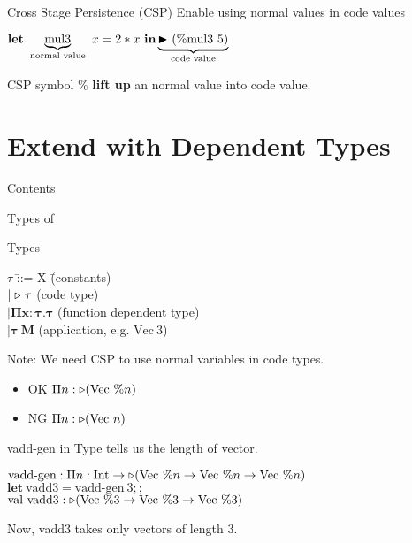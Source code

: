 \documentclass[dvipdfmx,aspectratio=169, 20pt]{beamer}
\begin{document}
\begin{frame}[fragile]{Cross Stage Persistence (CSP)}
    Enable using normal values in code values
    \begin{center}
        \( \textbf{let}\ \underbrace{\text{mul3}}_{\text{normal value}}\ x = 2 * x\ \textbf{in} \underbrace{{\mathop{\blacktriangleright}}\ (\% \text{mul3}\ 5)}_{\text{code value}} \)
    \end{center}
    CSP symbol \( \% \) {\bf{lift up}} an normal value into code value.
\end{frame}

\section{Extend \LTP with Dependent Types}

\begin{frame}{Contents}
    \tableofcontents[currentsection]
  \note{
  }
\end{frame}

\begin{frame}[fragile]{Types of \LMD}
    \begin{block}{Types}
    \begin{tabbing}
        \hspace{5mm} \( \tau \) \= ::= X \hspace{20mm} \= (constants) \\
        \> \( \mid {\mathop{\triangleright}}\ \tau \) \> (code type) \\
        \> \( \bm{\mid \Pi x:\tau.\tau} \) \> (function dependent type) \\
        \> \( \bm{\mid \tau\ M} \) \> (application, e.g. \(\text{Vec}\ 3\))
    \end{tabbing}
    \end{block}
    Note: We need CSP to use normal variables in code types.
    \begin{itemize}
        \item OK  \( \Pi n: {\mathop{\triangleright}} (\text{Vec}\ \%n) \)
        \item NG  \( \Pi n: {\mathop{\triangleright}} (\text{Vec}\ n) \)
    \end{itemize}
   \note{
    }
\end{frame}

\begin{frame}[fragile]{vadd-gen in \LMD}
    Type tells us the length of vector.
    \newcommand{\Vn}{\text{Vec}\ \%n}
    \newcommand{\Vt}{\text{Vec}\ \%3}
    \begin{tabbing}
        \hspace{5mm} \= \( \text{vadd-gen} : \Pi n:\I \to \TW (\Vn \to \Vn \to \Vn) \) \\[2mm]
        \> \( \textbf{let}\ \text{vadd3} = \text{vadd-gen}\ 3;; \) \\
        \> \( \text{val}\ \text{vadd3} : \TW (\Vt \to \Vt \to \Vt) \) \\[2mm]
    \end{tabbing}
    Now, vadd3 takes only vectors of length 3.
\end{frame}
\end{document}
